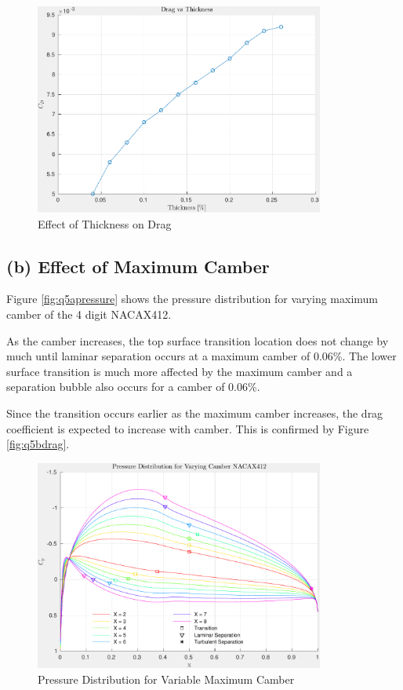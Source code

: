 \documentclass[letterpaper,12pt,]{article}
\begin{document}
\begin{figure}[!h]
    \centering
    \includegraphics[width = 0.85\textwidth]{./figures/q5dthick.pdf}
    \caption{Effect of Thickness on Drag}
    \label{fig:q5adrag}
\end{figure}

\subsection*{(b) Effect of Maximum Camber}

Figure \ref{fig:q5apressure} shows the pressure distribution for varying maximum camber of the 4 digit NACAX412.

As the camber increases, the top surface transition location does not change by much until laminar separation occurs at a maximum camber of 0.06\%.
The lower surface transition is much more affected by the maximum camber and a separation bubble also occurs for a camber of 0.06\%.

Since the transition occurs earlier as the maximum camber increases, the drag coefficient is expected to increase with camber. This is confirmed by Figure \ref{fig:q5bdrag}.

\begin{figure}[!h]
    \centering
    \includegraphics[width = 0.85\textwidth]{./figures/q5bpressure.pdf}
    \caption{Pressure Distribution for Variable Maximum Camber}
    \label{fig:q5bpressure}
\end{figure}
\end{document}

